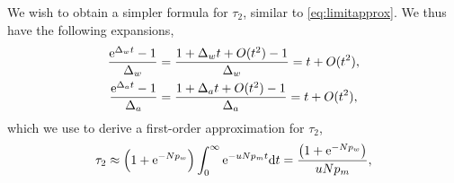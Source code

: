 \documentclass[12pt]{extarticle}
\renewcommand{\d}[1]{\ensuremath{\operatorname{d}\!{#1}}}
\renewcommand{\d}{{\rm d}}
\newcommand{\e}{{\rm e}}
\newcommand{\erfc}{{\rm erfc}}
\begin{document}
\begin{appendices}
We wish to obtain a simpler formula for $\tau_2$, similar to \cref{eq:limitapprox}.
We thus have the following expansions,
%
\begin{align*}
\frac{\e^{\Delta_w t}-1}{\Delta_w}&=\frac{1+\Delta_w t+O(t^2)-1}{\Delta_w} = t+O(t^2),\\
\frac{\e^{\Delta_a t}-1}{\Delta_a}&=\frac{1+\Delta_a t+O(t^2)-1}{\Delta_a} = t+O(t^2),
\end{align*}
which we use to derive a first-order approximation for $\tau_2$,
\begin{align}\label{limitapprox3_appendix}
\tau_2 \approx
\left(1+\e^{-Np_w}\right)\int_0^\infty\e^{-u N p_m t} \d t = 
\frac{\left(1+\e^{-Np_w}\right)}{uNp_m} ,
\end{align}


\end{appendices}

\end{document}
